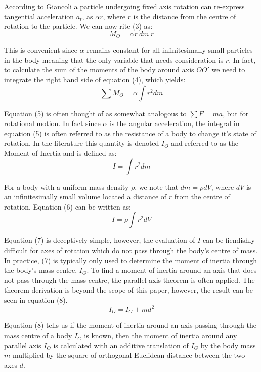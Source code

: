\documentclass[a4paper]{article}
\begin{document}
According to Giancoli a particle undergoing fixed axis rotation can re-express tangential acceleration $a_t$, as $\alpha r$, where $r$ is the distance from the centre of rotation to the particle. We can now rite (3) as:
\begin{equation}
M_O = \alpha r \ dm \ r
\end{equation}

This is convenient since $\alpha$ remains constant for all infinitesimally small particles in the body meaning that the only variable that needs consideration is $r$. In fact, to calculate the sum of the moments of the body around axis $OO'$ we need to integrate the right hand side of equation (4), which yields:
\begin{equation}
\sum M_O = \alpha \int r^2 dm
\end{equation}

Equation (5) is often thought of as somewhat analogous to $\sum F = ma$, but for rotational motion. In fact since $\alpha$ is the angular acceleration, the integral in equation (5) is often referred to as the resistance of a body to change it's state of rotation. In the literature this quantity is denoted $I_O$ and referred to as the Moment of Inertia and is defined as:
\begin{equation}
I = \int r^2 dm
\end{equation}

For a body with a uniform mass density $\rho$, we note that $dm = \rho dV$, where $dV$ is an infinitesimally small volume located a distance of $r$ from the centre of rotation. Equation (6) can be written as:
\begin{equation}
I = \rho \int r^2 dV 
\end{equation}

Equation (7) is deceptively simple, however, the evaluation of $I$ can be fiendishly difficult for axes of rotation which do not pass through the body's centre of mass. In practice, (7) is typically only used to determine the moment of inertia through the body's mass centre, $I_G$. To find a moment of inertia around an axis that does not pass through the mass centre, the parallel axis theorem is often applied. The theorem derivation is beyond the scope of this paper, however, the result can be seen in equation (8).
\begin{equation}
I_O = I_G + md^2
\end{equation}

Equation (8) tells us if the moment of inertia around an axis passing through the mass centre of a body $I_G$ is known, then the moment of inertia around any parallel axis $I_O$ is calculated with an additive translation of $I_G$ by the body mass $m$ multiplied by the square of orthogonal Euclidean distance between the two axes $d$.
\end{document}
